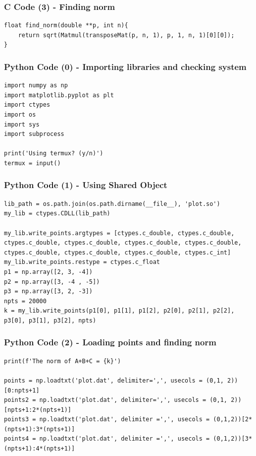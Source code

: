 \documentclass{beamer}
\begin{document}
\begin{frame}[fragile]
    \frametitle{C Code (3) - Finding norm}

\begin{lstlisting}
float find_norm(double **p, int n){
    return sqrt(Matmul(transposeMat(p, n, 1), p, 1, n, 1)[0][0]);
}
\end{lstlisting}
\end{frame}

\begin{frame}[fragile]
    \frametitle{Python Code (0) - Importing libraries and checking system}
    \begin{lstlisting}
import numpy as np
import matplotlib.pyplot as plt
import ctypes
import os
import sys
import subprocess

print('Using termux? (y/n)')
termux = input()
\end{lstlisting}
\end{frame}

\begin{frame}[fragile]
    \frametitle{Python Code (1) - Using Shared Object}
    \begin{lstlisting}
lib_path = os.path.join(os.path.dirname(__file__), 'plot.so')
my_lib = ctypes.CDLL(lib_path)

my_lib.write_points.argtypes = [ctypes.c_double, ctypes.c_double, ctypes.c_double, ctypes.c_double, ctypes.c_double, ctypes.c_double, ctypes.c_double, ctypes.c_double, ctypes.c_double, ctypes.c_int]
my_lib.write_points.restype = ctypes.c_float
p1 = np.array([2, 3, -4])
p2 = np.array([3, -4 , -5])
p3 = np.array([3, 2, -3])
npts = 20000
k = my_lib.write_points(p1[0], p1[1], p1[2], p2[0], p2[1], p2[2], p3[0], p3[1], p3[2], npts)
\end{lstlisting}
\end{frame}

\begin{frame}[fragile]
    \frametitle{Python Code (2) - Loading points and finding norm}
    \begin{lstlisting}
print(f'The norm of A+B+C = {k}')

points = np.loadtxt('plot.dat', delimiter=',', usecols = (0,1, 2))[0:npts+1]
points2 = np.loadtxt('plot.dat', delimiter=',', usecols = (0,1, 2))[npts+1:2*(npts+1)]
points3 = np.loadtxt('plot.dat', delimiter =',', usecols = (0,1,2))[2*(npts+1):3*(npts+1)]
points4 = np.loadtxt('plot.dat', delimiter =',', usecols = (0,1,2))[3*(npts+1):4*(npts+1)]
\end{lstlisting}
\end{frame}
\end{document}
